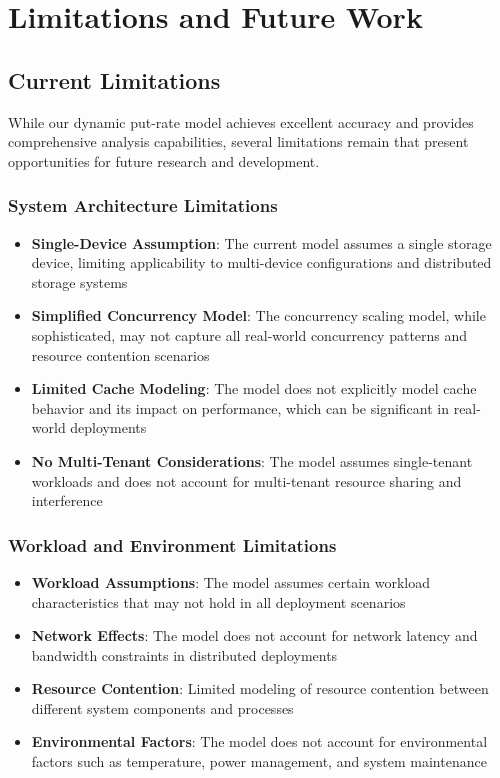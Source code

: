 \documentclass[11pt]{article}
\begin{document}
\section{Limitations and Future Work}

\subsection{Current Limitations}

While our dynamic put-rate model achieves excellent accuracy and provides comprehensive analysis capabilities, several limitations remain that present opportunities for future research and development.

\subsubsection{System Architecture Limitations}
\begin{itemize}
    \item \textbf{Single-Device Assumption}: The current model assumes a single storage device, limiting applicability to multi-device configurations and distributed storage systems
    \item \textbf{Simplified Concurrency Model}: The concurrency scaling model, while sophisticated, may not capture all real-world concurrency patterns and resource contention scenarios
    \item \textbf{Limited Cache Modeling}: The model does not explicitly model cache behavior and its impact on performance, which can be significant in real-world deployments
    \item \textbf{No Multi-Tenant Considerations}: The model assumes single-tenant workloads and does not account for multi-tenant resource sharing and interference
\end{itemize}

\subsubsection{Workload and Environment Limitations}
\begin{itemize}
    \item \textbf{Workload Assumptions}: The model assumes certain workload characteristics that may not hold in all deployment scenarios
    \item \textbf{Network Effects}: The model does not account for network latency and bandwidth constraints in distributed deployments
    \item \textbf{Resource Contention}: Limited modeling of resource contention between different system components and processes
    \item \textbf{Environmental Factors}: The model does not account for environmental factors such as temperature, power management, and system maintenance
\end{itemize}
\end{document}

